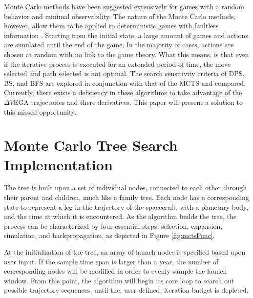 \documentclass[letterpaper, preprint, paper,11pt]{AAS}	%
\newcommand*\circled[1]{\tikz[baseline=(char.base)]{
            \node[shape=circle,draw,inner sep=0.8pt] (char) {#1};}}
\begin{document}
Monte Carlo methods have been suggested extensively for games with a random behavior and minimal observability. The nature of the Monte Carlo methods, however, allow them to be applied to deterministic games with faultless information \cite{Browne2012}. Starting from the initial state, a large amount of games and actions are simulated until the end of the game. In the majority of cases, actions are chosen at random with no link to the game theory. What this means, is that even if the iterative process is executed for an extended period of time, the move selected and path selected is not optimal. The search sensitivity criteria of DPS, BS, and BFS are explored in conjunction with that of the MCTS and compared. Currently, there exists a deficiency in these algorithms to take advantage of the $\Delta V$EGA trajectories and there derivatives. This paper will present a solution to this missed opportunity.

\section*{Monte Carlo Tree Search Implementation}

The tree is built upon a set of individual nodes, connected to each other through their parent and children, much like a family tree. Each node has a corresponding state to represent a leg in the trajectory of the spacecraft, with a planetary body, and the time at which it is encountered. As the algorithm builds the tree, the process can be characterized by four essential steps: \circled{1} selection, \circled{2} expansion, \circled{3} simulation, and \circled{4} backpropagation, as depicted in Figure \ref*{fig:mctsFunc}.

At the initialization of the tree, an array of launch nodes is specified based upon user input. If the sample time span is larger than a year, the number of corresponding nodes will be modified in order to evenly sample the launch window. From this point, the algorithm will begin its core loop to search out possible trajectory sequences, until the, user defined, iteration budget is depleted.
\end{document}
